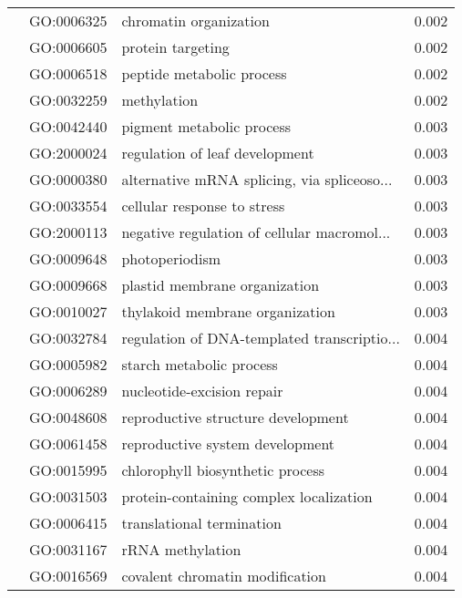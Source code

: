 \begin{longtable}{lllr}
   & GO:0006325 &                       chromatin organization &         0.002 \\
   & GO:0006605 &                            protein targeting &         0.002 \\
   & GO:0006518 &                    peptide metabolic process &         0.002 \\
   & GO:0032259 &                                  methylation &         0.002 \\
   & GO:0042440 &                    pigment metabolic process &         0.003 \\
   & GO:2000024 &               regulation of leaf development &         0.003 \\
   & GO:0000380 &  alternative mRNA splicing, via spliceoso... &         0.003 \\
   & GO:0033554 &                  cellular response to stress &         0.003 \\
   & GO:2000113 &  negative regulation of cellular macromol... &         0.003 \\
   & GO:0009648 &                               photoperiodism &         0.003 \\
   & GO:0009668 &                plastid membrane organization &         0.003 \\
   & GO:0010027 &              thylakoid membrane organization &         0.003 \\
   & GO:0032784 &  regulation of DNA-templated transcriptio... &         0.004 \\
   & GO:0005982 &                     starch metabolic process &         0.004 \\
   & GO:0006289 &                   nucleotide-excision repair &         0.004 \\
   & GO:0048608 &           reproductive structure development &         0.004 \\
   & GO:0061458 &              reproductive system development &         0.004 \\
   & GO:0015995 &             chlorophyll biosynthetic process &         0.004 \\
   & GO:0031503 &      protein-containing complex localization &         0.004 \\
   & GO:0006415 &                    translational termination &         0.004 \\
   & GO:0031167 &                             rRNA methylation &         0.004 \\
   & GO:0016569 &              covalent chromatin modification &         0.004 \\

\end{longtable}
